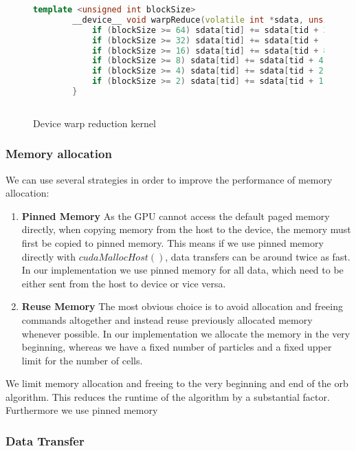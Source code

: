 \documentclass[]{article}
\begin{document}
\begin{figure}[H]
	\begin{lstlisting}[language=c++]
		template <unsigned int blockSize>
		__device__ void warpReduce(volatile int *sdata, unsigned int tid) {
			if (blockSize >= 64) sdata[tid] += sdata[tid + 32];
			if (blockSize >= 32) sdata[tid] += sdata[tid + 16];
			if (blockSize >= 16) sdata[tid] += sdata[tid + 8];
			if (blockSize >= 8) sdata[tid] += sdata[tid + 4];
			if (blockSize >= 4) sdata[tid] += sdata[tid + 2];
			if (blockSize >= 2) sdata[tid] += sdata[tid + 1];
		}
		
	\end{lstlisting}
	\caption{Device warp reduction kernel}
	\label{cuda:warp-device}
\end{figure}


\subsubsection{Memory allocation}

We can use several strategies in order to improve the performance of memory allocation: 

\begin{enumerate}
	\item \textbf{Pinned Memory} As the GPU cannot access the default paged memory directly, when copying memory from the host to the device, the memory must first be copied to pinned memory. This means if we use pinned memory directly with $cudaMallocHost()$, data transfers can be around twice as fast. In our implementation we use pinned memory for all data, which need to be either sent from the host to device or vice versa.
	\item \textbf{Reuse Memory} The most obvious choice is to avoid allocation and freeing commands altogether and instead reuse previously allocated memory whenever possible. In our implementation we allocate the memory in the very beginning, whereas we have a fixed number of particles and a fixed upper limit for the number of cells. 
	
\end{enumerate}

We limit memory allocation and freeing to the very beginning and end of the orb algorithm. This reduces the runtime of the algorithm by a substantial factor. Furthermore we use pinned memory

\subsubsection{Data Transfer}
\end{document}

